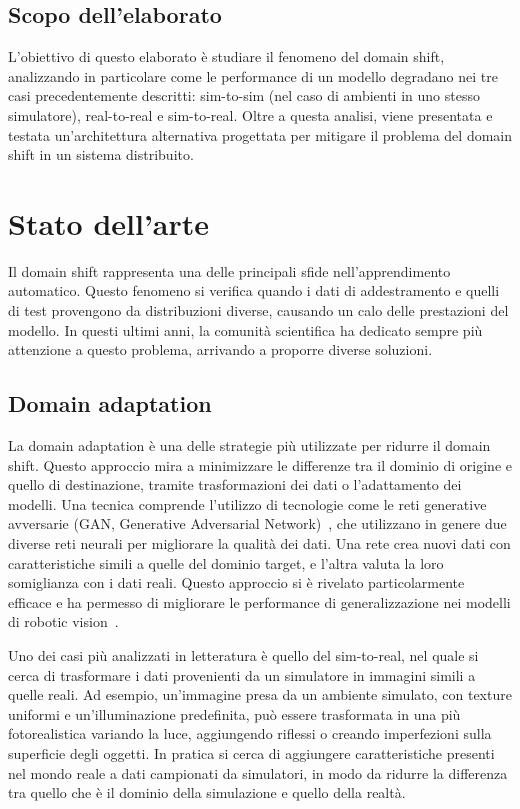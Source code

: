 \documentclass[12pt]{report}
\begin{document}
\section{Scopo dell'elaborato}
\label{sec:scopo_dell_elaborato}

L'obiettivo di questo elaborato è studiare il fenomeno del domain shift, analizzando in particolare come le performance di un modello degradano nei tre casi precedentemente descritti: sim-to-sim (nel caso di ambienti in uno stesso simulatore), real-to-real e sim-to-real. Oltre a questa analisi, viene presentata e testata un'architettura alternativa progettata per mitigare il problema del domain shift in un sistema distribuito.

\chapter{Stato dell'arte}
\label{chap:stato_arte}

Il domain shift rappresenta una delle principali sfide nell'apprendimento automatico. Questo fenomeno si verifica quando i dati di addestramento e quelli di test provengono da distribuzioni diverse, causando un calo delle prestazioni del modello. In questi ultimi anni, la comunità scientifica ha dedicato sempre più attenzione a questo problema, arrivando a proporre diverse soluzioni.

\section{Domain adaptation}
\label{sec:adaptation}

La domain adaptation è una delle strategie più utilizzate per ridurre il domain shift. Questo approccio mira a minimizzare le differenze tra il dominio di origine e quello di destinazione, tramite trasformazioni dei dati o l'adattamento dei modelli. Una tecnica comprende l'utilizzo di tecnologie come le reti generative avversarie (GAN, Generative Adversarial Network)~\cite{10.1145/3422622}, che utilizzano in genere due diverse reti neurali per migliorare la qualità dei dati. Una rete crea nuovi dati con caratteristiche simili a quelle del dominio target, e l'altra valuta la loro somiglianza con i dati reali. Questo approccio si è rivelato particolarmente efficace e ha permesso di migliorare le performance di generalizzazione nei modelli di robotic vision~\cite{Shrivastava_2017_CVPR}.

Uno dei casi più analizzati in letteratura è quello del sim-to-real, nel quale si cerca di trasformare i dati provenienti da un simulatore in immagini simili a quelle reali. Ad esempio, un'immagine presa da un ambiente simulato, con texture uniformi e un'illuminazione predefinita, può essere trasformata in una più fotorealistica variando la luce, aggiungendo riflessi o creando imperfezioni sulla superficie degli oggetti. In pratica si cerca di aggiungere caratteristiche presenti nel mondo reale a dati campionati da simulatori, in modo da ridurre la differenza tra quello che è il dominio della simulazione e quello della realtà.
\end{document}
